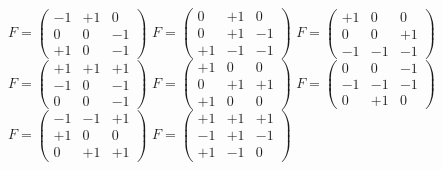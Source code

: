 $F=\left( \begin{array}{ccc} -1 & +1 & 0 \\ 0 & 0 & -1 \\ +1 & 0 & -1 \end{array} \right) $
$F=\left( \begin{array}{ccc} 0 & +1 & 0 \\ 0 & +1 & -1 \\ +1 & -1 & -1 \end{array} \right) $
$F=\left( \begin{array}{ccc} +1 & 0 & 0 \\ 0 & 0 & +1 \\ -1 & -1 & -1 \end{array} \right) $
$F=\left( \begin{array}{ccc} +1 & +1 & +1 \\ -1 & 0 & -1 \\ 0 & 0 & -1 \end{array} \right) $
$F=\left( \begin{array}{ccc} +1 & 0 & 0  \\ 0 & +1 & +1 \\ +1 & 0 & 0 \end{array} \right) $
$F=\left( \begin{array}{ccc} 0 & 0 & -1 \\ -1 & -1 & -1 \\ 0 & +1 & 0 \end{array} \right) $
$F=\left( \begin{array}{ccc} -1 & -1 & +1 \\ +1 & 0 & 0 \\ 0 & +1 & +1 \end{array} \right) $
$F=\left( \begin{array}{ccc} +1 & +1 & +1 \\ -1 & +1 & -1 \\ +1 & -1 & 0 \end{array} \right) $
